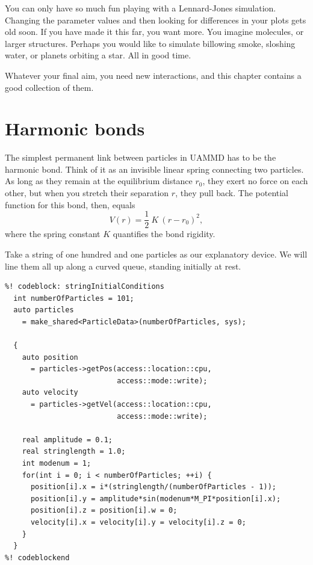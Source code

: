 
You can only have so much fun playing with a Lennard-Jones simulation. Changing
the parameter values and then looking for differences in your plots gets old
soon. If you have made it this far, you want more. You imagine molecules, or
larger structures. Perhaps you would like to simulate billowing smoke, sloshing
water, or planets orbiting a star. All in good time.

Whatever your final aim, you need new interactions, and this chapter contains a
good collection of them.

\section{Harmonic bonds}

The simplest permanent link between particles in UAMMD has to be the harmonic
bond. Think of it as an invisible linear spring connecting two particles. As
long as they remain at the equilibrium distance $r_0$, they exert no force on
each other, but when you stretch their separation $r$, they pull back. The
potential function for this bond, then, equals
\begin{equation*}
  V(r) = \frac{1}{2}\ K\ (r - r_0)^2,
\end{equation*}
where the spring constant $K$ quantifies the bond rigidity.

Take a string of one hundred and one particles as our explanatory device. We
will line them all up along a curved queue, standing initially at rest.
\label{stringInitialConditions}
\begin{lstlisting}
%! codeblock: stringInitialConditions
  int numberOfParticles = 101;
  auto particles
    = make_shared<ParticleData>(numberOfParticles, sys);

  {
    auto position
      = particles->getPos(access::location::cpu,
                          access::mode::write);
    auto velocity
      = particles->getVel(access::location::cpu,
                          access::mode::write);

    real amplitude = 0.1;
    real stringlength = 1.0;
    int modenum = 1;
    for(int i = 0; i < numberOfParticles; ++i) {
      position[i].x = i*(stringlength/(numberOfParticles - 1));
      position[i].y = amplitude*sin(modenum*M_PI*position[i].x);
      position[i].z = position[i].w = 0;
      velocity[i].x = velocity[i].y = velocity[i].z = 0;
    }
  }
%! codeblockend
\end{lstlisting}

